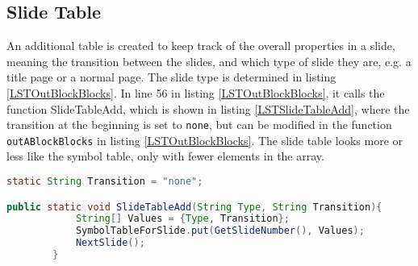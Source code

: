 
\subsection{Slide Table}
An additional table is created to keep track of the overall properties in a slide, meaning the transition between the slides, and which type of slide they are, e.g. a title page or a normal page.
The slide type is determined in listing \ref{LSTOutBlockBlocks}. In line 56 in listing \ref{LSTOutBlockBlocks}, it calls the function SlideTableAdd, which is shown in listing \ref{LSTSlideTableAdd}, where the transition at the beginning is set to \texttt{none}, but can be modified in the function \texttt{outABlockBlocks} in listing \ref{LSTOutBlockBlocks}. The slide table looks more or less like the symbol table, only with fewer elements in the array.

\begin{lstlisting}[frame=single,caption= Function: SlideTableAdd, label=LSTSlideTableAdd, language=java]
static String Transition = "none";

public static void SlideTableAdd(String Type, String Transition){
			String[] Values = {Type, Transition};
			SymbolTableForSlide.put(GetSlideNumber(), Values);
			NextSlide();
		}  
\end{lstlisting}